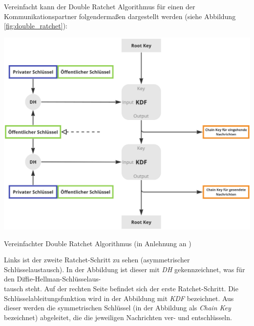 Vereinfacht kann der Double Ratchet Algorithmus für einen der Kommunikationspartner folgendermaßen dargestellt werden (siehe Abbildung \ref{fig:double_ratchet}):


\begin{center}
    \captionsetup{type=figure}
    \includegraphics[width=0.8\linewidth]{images/double_ratchet_altered.png}
    \caption{Vereinfachter Double Ratchet Algorithmus (in Anlehnung an \cite{Signal_DoubleRatchet})}
    \label{fig:double_ratchet}
\end{center}

\noindent Links ist der zweite Ratchet-Schritt zu sehen (asymmetrischer Schlüsselaustausch). In der Abbildung ist dieser mit \textit{DH} gekennzeichnet, was für den Diffie-Hellman-Schlüsselaus-\\tausch steht. Auf der rechten Seite befindet sich der erste Ratchet-Schritt. Die Schlüsselableitungsfunktion wird in der Abbildung mit \textit{KDF} bezeichnet. Aus dieser werden die symmetrischen Schlüssel (in der Abbildung als \textit{Chain Key} bezeichnet) abgeleitet, die die jeweiligen Nachrichten ver- und entschlüsseln.

